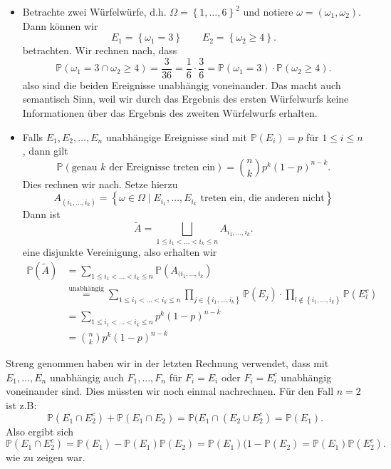 \begin{example}
    \begin{itemize}
        \item 
    Betrachte zwei Würfelwürfe, d.h. $\Omega = \left \{1,\ldots,6\right\} ^2$ und notiere $\omega = (\omega_1,\omega_2)$. Dann können wir
    \[
    E_1 = \left \{\omega_1 = 3\right\}  \qquad E_2 = \left \{\omega_2 \geq  4\right\} 
    .\] 
    betrachten. Wir rechnen nach, dass
    \[
        \mathbb{P}(\omega_1 = 3 \cap \omega_2 \geq  4 ) = \frac{3}{36} = \frac{1}{6}\cdot \frac{3}{6} = \mathbb{P}(\omega_1 = 3) \cdot \mathbb{P}(\omega_2 \geq  4)
    .\] 
    also sind die beiden Ereignisse unabhängig voneinander. Das macht auch semantisch Sinn, weil wir durch das Ergebnis des ersten Würfelwurfs keine Informationen über das Ergebnis des zweiten Würfelwurfs erhalten.
\item

Falls $E_1,E_2,\ldots,E_n$ unabhängige Ereignisse sind mit $\mathbb{P}(E_i) = p$ für $1\leq i\leq n$, dann gilt
\[
    \mathbb{P}(\text{genau $k$ der Ereignisse treten ein}) = \binom{n}{k} p^k (1-p)^{n-k}
.\] 
Dies rechnen wir nach. Setze hierzu 
\[
    A_{(i_1,\ldots,i_k)} = \left \{\omega\in \Omega \mid  E_{i_1},\ldots,E_{i_k} \text{ treten ein, die anderen nicht}\right\}
\]
Dann ist
\[
\tilde{A} = \bigsqcup_{1\leq i_1<\ldots<i_k \leq n} A_{i_1,\ldots,i_k}
.\] 
eine disjunkte Vereinigung, also erhalten wir
\begin{equation}
    \begin{split}
        \mathbb{P}(\tilde{A})                                 &= \sum_{1\leq i_1<\ldots<i_k\leq n} \mathbb{P}(A_{(i_1,\ldots,i_k}) \\
                                                              &\stackrel{\text{unabhängig}}{=} \sum_{1\leq i_1<\ldots<i_k \leq n} \prod_{j\in \left \{i_1,\ldots,i_k\right\} } \mathbb{P}(E_j) \cdot \prod_{l \not\in \left \{i_1,\ldots,i_k\right\} } \mathbb{P}(E_l^{c}) \\
                                                              &= \sum_{1\leq i_1<\ldots<i_k \leq n} p^k(1-p)^{n-k} \\
                                                              &= \binom{n}{k} p^k (1-p)^{n-k}
    \end{split}
\end{equation}
    \end{itemize}
\end{example}
\begin{remark}
    Streng genommen haben wir in der letzten Rechnung verwendet, dass mit $E_1,\ldots,E_n$ unabhängig auch $F_1,\ldots,F_n$ für $F_i = E_i $ oder  $F_i = E_i ^{c}$ unabhängig voneinander sind. Dies müssten wir noch einmal nachrechnen. Für den Fall $n=2$ ist z.B:
     \[
         \mathbb{P}(E_1 \cap E_2^{c}) + \mathbb{P}(E_1 \cap E_2) = \mathbb{P}(E_1 \cap (E_2 \cup E_2^{c}) = \mathbb{P}(E_1)
    .\] 
    Also ergibt sich
    \[
        \mathbb{P}(E_1\cap E_2^{c}) = \mathbb{P}(E_1) - \mathbb{P}(E_1)\mathbb{P}(E_2) = \mathbb{P}(E_1)(1-\mathbb{P}(E_2) = \mathbb{P}(E_1) \mathbb{P}(E_2^{c})
    .\] 
    wie zu zeigen war.
\end{remark}
